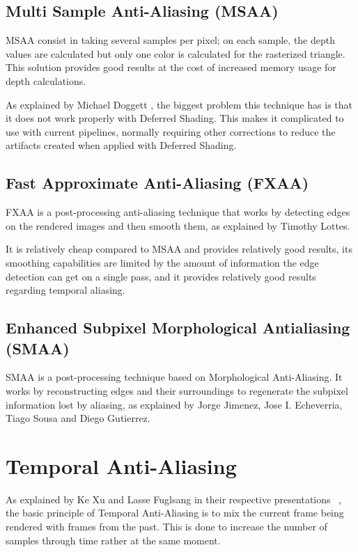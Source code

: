 \documentclass{cslthse-msc}
\begin{document}
\subsection{Multi Sample Anti-Aliasing (MSAA)}
MSAA consist in taking several samples per pixel; on each sample, the depth values are calculated but only one color is calculated for the rasterized triangle. This solution provides good results at the cost of increased memory usage for depth calculations. 

As explained by Michael Doggett \cite{Doggett2017EDAN35}, the biggest problem this technique has is that it does not work properly with Deferred Shading. This makes it complicated to use with current pipelines, normally requiring other corrections to reduce the artifacts created when applied with Deferred Shading.

\subsection{Fast Approximate Anti-Aliasing (FXAA)}
FXAA is a post-processing anti-aliasing technique that works by detecting edges on the rendered images and then smooth them, as explained by Timothy Lottes. \cite{Lottes2009}

It is relatively cheap compared to MSAA and provides relatively good results, its smoothing capabilities are limited by the amount of information the edge detection can get on a single pass, and it provides relatively good results regarding temporal aliasing.

\subsection{Enhanced Subpixel Morphological Antialiasing (SMAA)}
SMAA is a post-processing technique based on Morphological Anti-Aliasing. It works by reconstructing edges and their surroundings to regenerate the subpixel information lost by aliasing, as explained by Jorge Jimenez, Jose I. Echeverria, Tiago Sousa and Diego Gutierrez. \cite{Jimenez2012}

\section{Temporal Anti-Aliasing}
As explained by Ke Xu and Lasse Fuglsang in their respective presentations ~\cite{Fuglsand2016,XU2016}, the basic principle of Temporal Anti-Aliasing is to mix the current frame being rendered with frames from the past. This is done to increase the number of samples through time rather at the same moment. 
\end{document}
